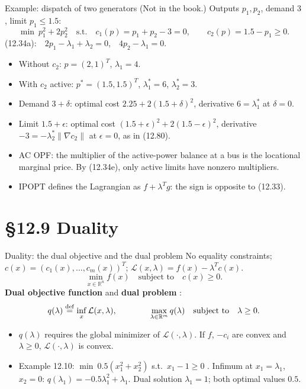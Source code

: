 \documentclass[aspectratio=169,12pt]{beamer}
\newcommand{\R}{\mathbb{R}}
\newcommand{\eqn}[1]{\text{\small(#1)}}
\newcommand{\ls}{\lambda^{*}}
\newcommand{\cL}{\mathcal{L}}
\begin{document}
\begin{frame}{Example: dispatch of two generators {\normalfont\small(Not in the book.)}}
  Outputs $p_{1},p_{2}$, demand $3$, limit $p_{1}\le 1.5$:
  \[ \min\ p_{1}^{2}+2p_{2}^{2}\quad\text{s.t.}\quad c_{1}(p)=p_{1}+p_{2}-3=0,\qquad c_{2}(p)=1.5-p_{1}\ge 0 . \]
  (12.34a):\ \ $2p_{1}-\lambda_{1}+\lambda_{2}=0$,\ \ $4p_{2}-\lambda_{1}=0$.
  \begin{itemize}\setlength\itemsep{0.25em}
    \item Without $c_{2}$: $p=(2,1)^{T}$, $\lambda_{1}=4$.
    \item With $c_{2}$ active: $p^{*}=(1.5,1.5)^{T}$, $\ls_{1}=6$, $\ls_{2}=3$.
    \item Demand $3+\delta$: optimal cost $2.25+2(1.5+\delta)^{2}$, derivative $6=\ls_{1}$ at $\delta=0$.
    \item Limit $1.5+\epsilon$: optimal cost $(1.5+\epsilon)^{2}+2(1.5-\epsilon)^{2}$, derivative
      $-3=-\ls_{2}\|\nabla c_{2}\|$ at $\epsilon=0$, as in (12.80).
    \item AC OPF: the multiplier of the active-power balance at a bus is the locational marginal
      price. By (12.34e), only active limits have nonzero multipliers.
    \item IPOPT defines the Lagrangian as $f+\lambda^{T}g$: the sign is opposite to (12.33).
  \end{itemize}
\end{frame}

\section{\S12.9 Duality}

\begin{frame}{Duality: the dual objective and the dual problem}
  No equality constraints; $c(x)=(c_{1}(x),\dots,c_{m}(x))^{T}$; $\cL(x,\lambda)=f(x)-\lambda^{T}c(x)$.
  \[ \min_{x\in\R^{n}} f(x)\quad\text{subject to}\quad c(x)\ge 0 . \tag{12.81} \]
  \textbf{Dual objective function} \eqn{12.82} and \textbf{dual problem} \eqn{12.84}:
  \[ q(\lambda)\stackrel{\rm def}{=}\inf_{x}\cL(x,\lambda),\qquad\qquad
     \max_{\lambda\in\R^{m}} q(\lambda)\quad\text{subject to}\quad\lambda\ge 0 . \]
  \begin{itemize}\setlength\itemsep{0.25em}
    \item $q(\lambda)$ requires the global minimizer of $\cL(\cdot,\lambda)$. If $f$, $-c_{i}$
      are convex and $\lambda\ge 0$, $\cL(\cdot,\lambda)$ is convex.
    \item Example 12.10: $\min\ 0.5(x_{1}^{2}+x_{2}^{2})$ s.t.\ $x_{1}-1\ge 0$ \eqn{12.85}. Infimum at
      $x_{1}=\lambda_{1}$, $x_{2}=0$: $q(\lambda_{1})=-0.5\lambda_{1}^{2}+\lambda_{1}$. Dual solution
      $\lambda_{1}=1$; both optimal values $0.5$.
  \end{itemize}
\end{frame}
\end{document}
